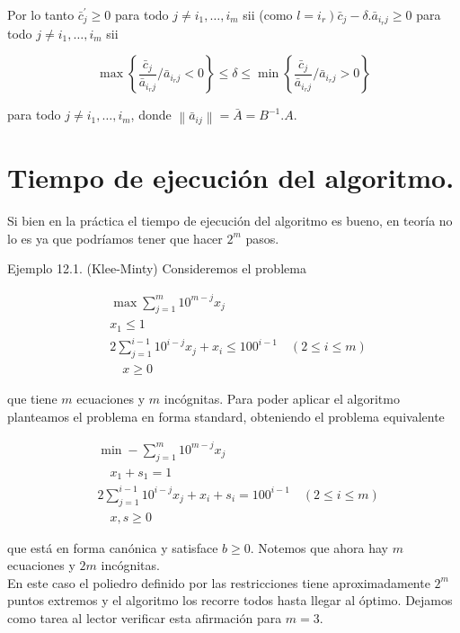 \documentclass[10pt]{article}
\begin{document}
Por lo tanto $\bar{c}_{j}^{\prime} \geq 0$ para todo $j \neq i_{1}, \ldots, i_{m}$ sii (como $\left.l=i_{r}\right) \bar{c}_{j}-\delta . \bar{a}_{i_{r} j} \geq 0$ para todo $j \neq i_{1}, \ldots, i_{m}$ sii

$$
\max \left\{\frac{\bar{c}_{j}}{\bar{a}_{i_{r} j}} / \bar{a}_{i_{r} j}<0\right\} \leq \delta \leq \min \left\{\frac{\bar{c}_{j}}{\bar{a}_{i_{r} j}} / \bar{a}_{i_{r} j}>0\right\}
$$

para todo $j \neq i_{1}, \ldots, i_{m}$, donde $\left\|\bar{a}_{i j}\right\|=\bar{A}=B^{-1} . A$.

\section*{Tiempo de ejecución del algoritmo.}
Si bien en la práctica el tiempo de ejecución del algoritmo es bueno, en teoría no lo es ya que podríamos tener que hacer $2^{m}$ pasos.

Ejemplo 12.1. (Klee-Minty) Consideremos el problema

$$
\begin{aligned}
& \max \sum_{j=1}^{m} 10^{m-j} x_{j} \\
& x_{1} \leq 1 \\
& 2 \sum_{j=1}^{i-1} 10^{i-j} x_{j}+x_{i} \leq 100^{i-1} \quad(2 \leq i \leq m) \\
& \quad x \geq 0
\end{aligned}
$$

que tiene $m$ ecuaciones y $m$ incógnitas. Para poder aplicar el algoritmo planteamos el problema en forma standard, obteniendo el problema equivalente

$$
\begin{aligned}
& \min -\sum_{j=1}^{m} 10^{m-j} x_{j} \\
& \quad x_{1}+s_{1}=1 \\
& 2 \sum_{j=1}^{i-1} 10^{i-j} x_{j}+x_{i}+s_{i}=100^{i-1} \quad(2 \leq i \leq m) \\
& \quad x, s \geq 0
\end{aligned}
$$

que está en forma canónica y satisface $b \geq 0$. Notemos que ahora hay $m$ ecuaciones y $2 m$ incógnitas.\\
En este caso el poliedro definido por las restricciones tiene aproximadamente $2^{m}$ puntos extremos y el algoritmo los recorre todos hasta llegar al óptimo. Dejamos como tarea al lector verificar esta afirmación para $m=3$.
\end{document}
